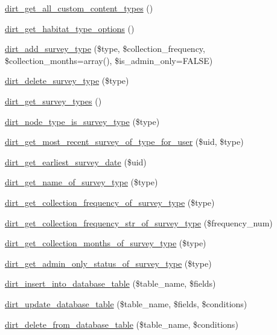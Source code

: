 \begin{DoxyCompactItemize}
\mbox{\hyperlink{dirt_8module_ad77aa7d68fd00dd691623ba7eddb2637}{dirt\+\_\+get\+\_\+all\+\_\+custom\+\_\+content\+\_\+types}} ()
\item 
\mbox{\hyperlink{dirt_8module_a4e704dbae445c08a671716dc59216977}{dirt\+\_\+get\+\_\+habitat\+\_\+type\+\_\+options}} ()
\item 
\mbox{\hyperlink{dirt_8module_a85f320016449a72071e36743131bbdbb}{dirt\+\_\+add\+\_\+survey\+\_\+type}} (\$type, \$collection\+\_\+frequency, \$collection\+\_\+months=array(), \$is\+\_\+admin\+\_\+only=F\+A\+L\+SE)
\item 
\mbox{\hyperlink{dirt_8module_a2ed670e45b883464cffce445c3eb5074}{dirt\+\_\+delete\+\_\+survey\+\_\+type}} (\$type)
\item 
\mbox{\hyperlink{dirt_8module_ada90829ba5f06026f865b94306d7a7b7}{dirt\+\_\+get\+\_\+survey\+\_\+types}} ()
\item 
\mbox{\hyperlink{dirt_8module_a18f2f2debc993aeca9d3c5cf9a8502f3}{dirt\+\_\+node\+\_\+type\+\_\+is\+\_\+survey\+\_\+type}} (\$type)
\item 
\mbox{\hyperlink{dirt_8module_a1b0c1e790019392ca655dae67aee9642}{dirt\+\_\+get\+\_\+most\+\_\+recent\+\_\+survey\+\_\+of\+\_\+type\+\_\+for\+\_\+user}} (\$uid, \$type)
\item 
\mbox{\hyperlink{dirt_8module_af6aa46d0228fd3bf9785876da3bc5e68}{dirt\+\_\+get\+\_\+earliest\+\_\+survey\+\_\+date}} (\$uid)
\item 
\mbox{\hyperlink{dirt_8module_a849912f065f1eee739fc37a802b82fc0}{dirt\+\_\+get\+\_\+name\+\_\+of\+\_\+survey\+\_\+type}} (\$type)
\item 
\mbox{\hyperlink{dirt_8module_a238fb95fed118eee2cd53bfab4afa05b}{dirt\+\_\+get\+\_\+collection\+\_\+frequency\+\_\+of\+\_\+survey\+\_\+type}} (\$type)
\item 
\mbox{\hyperlink{dirt_8module_ae47b3bab87dea7b46f8545d465cac7df}{dirt\+\_\+get\+\_\+collection\+\_\+frequency\+\_\+str\+\_\+of\+\_\+survey\+\_\+type}} (\$frequency\+\_\+num)
\item 
\mbox{\hyperlink{dirt_8module_ad259c270222503e45cc90dcc8597ff9c}{dirt\+\_\+get\+\_\+collection\+\_\+months\+\_\+of\+\_\+survey\+\_\+type}} (\$type)
\item 
\mbox{\hyperlink{dirt_8module_a7f83ec49df6ba43435f75feec8769ddf}{dirt\+\_\+get\+\_\+admin\+\_\+only\+\_\+status\+\_\+of\+\_\+survey\+\_\+type}} (\$type)
\item 
\mbox{\hyperlink{dirt_8module_aba2a3c9edf1b33ac51a86230a565d8cf}{dirt\+\_\+insert\+\_\+into\+\_\+database\+\_\+table}} (\$table\+\_\+name, \$fields)
\item 
\mbox{\hyperlink{dirt_8module_aed4cad0bd17b2644903d618b42b2871d}{dirt\+\_\+update\+\_\+database\+\_\+table}} (\$table\+\_\+name, \$fields, \$conditions)
\item 
\mbox{\hyperlink{dirt_8module_a7bcf4d6f0f9a75ef750e7e90cef8fab4}{dirt\+\_\+delete\+\_\+from\+\_\+database\+\_\+table}} (\$table\+\_\+name, \$conditions)
\end{DoxyCompactItemize}

